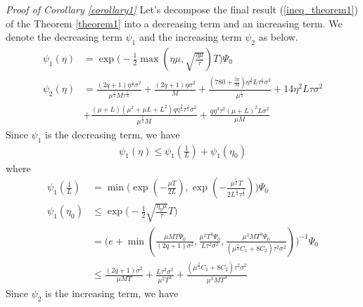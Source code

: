 \emph{Proof of Corollary \ref{corollary1}} \textrm{ } Let's decompose the final result (\ref{ineq_theorem1}) of the Theorem \ref{theorem1} into a decreasing term and an increasing term. We denote the decreasing term $\psi_1$ and the increasing term $\psi_2$ as below.
\begin{align*}
    \psi_1(\eta) &= \exp\Big( -\frac{1}{2}\max(\eta\mu, \sqrt{\frac{\eta\mu}{\tau}})T \Big)\Psi_0 \\
    \psi_2(\eta) &= \frac{(2q+1)\eta^{\frac{1}{2}}\sigma^2}{\mu^{\frac{1}{2}}M\tau^{\frac{1}{2}}} + \frac{(2q+1)\eta\sigma^2}{M} + \frac{(780+\frac{2q}{M})\eta^{\frac{3}{2}}L\tau^{\frac{1}{2}}\sigma^2}{\mu^{\frac{1}{2}}} + 14\eta^2 L\tau\sigma^2 \\
    &+ \frac{(\mu+L)(\mu^2+\mu L+L^2)q\eta^{\frac{3}{2}}\tau^{\frac{1}{2}}\sigma^2}{\mu^{\frac{5}{2}}M} + \frac{q\eta^3\tau^2(\mu+L)^2 L\sigma^2}{\mu M}
\end{align*}
Since $\psi_1$ is the decreasing term, we have
\begin{align} \label{ineq_corollary1-1}
    \psi_1(\eta) \leq \psi_1(\frac{1}{L}) + \psi_1(\eta_0)
\end{align}
where
\begin{align*}
    \psi_1(\frac{1}{L}) &= \min \Big( \exp(-\frac{\mu T}{2L}), \exp(-\frac{\mu^{\frac{1}{2}}T}{2 L^{\frac{1}{2}}\tau^{\frac{1}{2}}})\Big) \Psi_0 \\
    \psi_1(\eta_0) &\leq \exp \Big( -\frac{1}{2} \sqrt{\frac{\eta_0 \mu}{\tau}}T\Big) \\
    &= \Big(e+\min(\frac{\mu M T \Psi_0}{(2q+1)\sigma^2}, \frac{\mu^2 T^3\Psi_0}{L\tau^2\sigma^2}, \frac{\mu^3 M T^3\Psi_0}{(\mu^{\frac{3}{2}}C_1+8C_2)\tau^2\sigma^2}) \Big)^{-1} \Psi_0 \\
    &\leq \frac{(2q+1)\sigma^2}{\mu MT} + \frac{L\tau^2\sigma^2}{\mu^2 T^3} + \frac{(\mu^{\frac{3}{2}}C_1+8C_2)\tau^2\sigma^2}{\mu^3 M T^3}
\end{align*}
Since $\psi_2$ is the increasing term, we have
